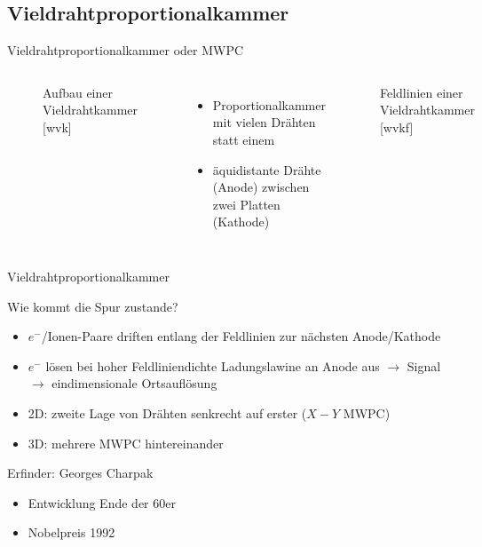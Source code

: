 \subsection[]{Vieldrahtproportionalkammer}


\begin{frame}{Vieldrahtproportionalkammer oder MWPC}
    \begin{columns}[T]
			\begin{figure}[htbp]
			  \centering
			  
			  \caption{Aufbau einer Vieldrahtkammer [wvk]}
			\end{figure}
			
	    	\begin{itemize}
	    	  \item Proportionalkammer mit vielen Drähten statt einem
			  \item äquidistante Drähte (Anode) zwischen zwei Platten (Kathode)
			\end{itemize}
			
			\begin{figure}[htbp]
			  \centering
			  
			  \caption{Feldlinien einer Vieldrahtkammer [wvkf]}
			\end{figure}
    \end{columns}
\end{frame}



\begin{frame}{Vieldrahtproportionalkammer}
    	\begin{block}{Wie kommt die Spur zustande?}
		\begin{itemize}
		  \item $e^-$/Ionen-Paare driften entlang der Feldlinien zur nächsten Anode/Kathode
		  \item $e^-$ lösen bei hoher Feldliniendichte Ladungslawine an Anode aus $\rightarrow$
		  Signal$\rightarrow$ eindimensionale Ortsauflösung
		  \item 2D: zweite Lage von Drähten senkrecht auf erster ($X-Y$ MWPC)
		  \item 3D: mehrere MWPC hintereinander
		\end{itemize}
	\end{block}
	\begin{block}{Erfinder: Georges Charpak}
		\begin{itemize}
		  \item Entwicklung Ende der 60er
		  \item Nobelpreis 1992 
		\end{itemize}
	\end{block}
\end{frame}

